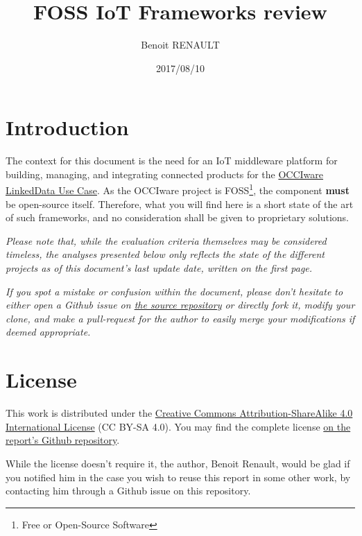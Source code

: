 \documentclass{article}
\title{FOSS IoT Frameworks review}
\author{Benoit RENAULT}
\date{2017/08/10}
\begin{document}
\maketitle

\tableofcontents

\newpage

\section*{Introduction}
%

The context for this document is the need for an IoT middleware platform for building, managing, and integrating connected products for the \href{https://github.com/occiware/occiware-ozwillo}{OCCIware LinkedData Use Case}. As the OCCIware project is FOSS\footnote{Free or Open-Source Software}, the component \textbf{must} be open-source itself. Therefore, what you will find here is a short state of the art of such frameworks, and no consideration shall be given to proprietary solutions.

\emph{Please note that, while the evaluation criteria themselves may be considered timeless, the analyses presented below only reflects the state of the different projects as of this document's last update date, written on the first page.}

\emph{If you spot a mistake or confusion within the document, please don't hesitate to either open a Github issue on \href{https://github.com/Xia0ben/FOSS_IoT_Frameworks}{the source repository} or directly fork it, modify your clone, and make a pull-request for the author to easily merge your modifications if deemed appropriate.}

\section*{License}
%

This work is distributed under the \href{https://creativecommons.org/licenses/by-sa/4.0/}{Creative Commons Attribution-ShareAlike 4.0 International License} (CC BY-SA 4.0). You may find the complete license \href{https://github.com/Xia0ben/FOSS_IoT_Frameworks/blob/master/LICENSE}{on the report's Github repository}.

While the license doesn't require it, the author, Benoit Renault, would be glad if you notified him in the case you wish to reuse this report in some other work, by contacting him through a Github issue on this repository.
\end{document}
